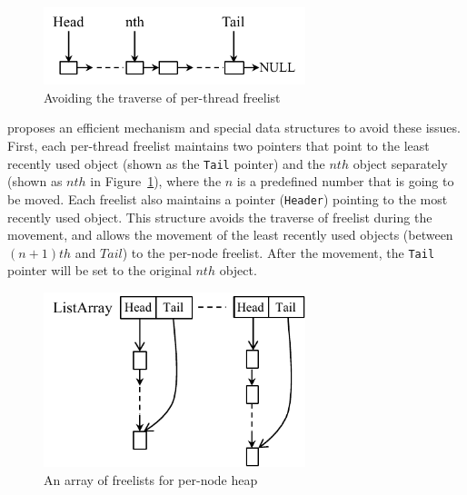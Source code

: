 
\begin{figure}[!h]
\centering
\includegraphics[width=3in]{figure/perthreadlist}
\caption{Avoiding the traverse of per-thread freelist\label{fig:perthreadlist}}
\end{figure}

\NM{} proposes an efficient mechanism and special data structures to avoid these issues. First, each per-thread freelist maintains two pointers that point to the least recently used object (shown as the \texttt{Tail} pointer) and the $nth$ object separately (shown as $nth$ in Figure~\ref{fig:perthreadlist}), where the $n$ is a predefined number that is going to be moved. Each freelist also maintains a pointer (\texttt{Header}) pointing to the most recently used object. This structure avoids the traverse of freelist during the movement, and allows the movement of the least recently used objects (between $(n+1)th$ and $Tail$) to the per-node freelist. After the movement, the \texttt{Tail} pointer will be set to the original $nth$ object. 


\begin{figure}[!ht]
\centering
\includegraphics[width=3in]{figure/listarray}
\caption{An array of freelists for per-node heap\label{fig:listarray}}
\end{figure}

